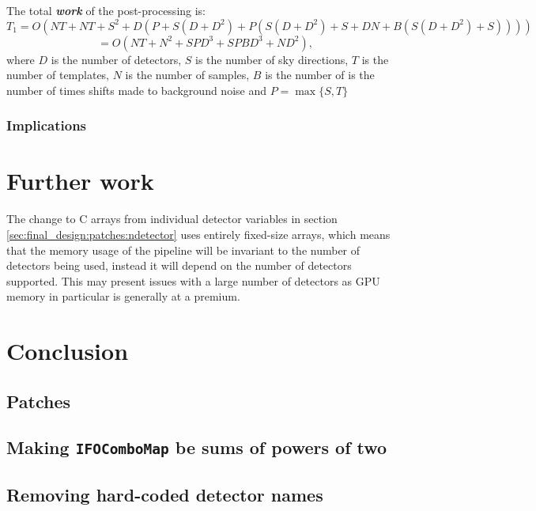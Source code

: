 \documentclass{article}
\begin{document}
The total \textit{\textbf{work}} of the post-processing is:
\[
    T_1 = O(NT + NT + S^2 + D(P + S(D + D^2) + P(S(D + D^2) + S + DN + B(S(D + D^2) + S))))
\]
\begin{equation} \label{eq:total_work}
    = O(NT + N^2 + SPD^3 + SPBD^3 + ND^2),
\end{equation}
where \(D\) is the number of detectors, \(S\) is the number of sky directions, \(T\) is the number of templates, \(N\) is the number of samples, \(B\) is the number of is the number of times shifts made to background noise and \(P = \max\{ S, T \}\)

\subsubsection{Implications} \label{sec:discuss:analysis:implications}


\section{Further work} \label{sec:further_work}

The change to C arrays from individual detector variables in section \ref{sec:final_design:patches:ndetector} uses entirely fixed-size arrays, which means that the memory usage of the pipeline will be invariant to the number of detectors being used, instead it will depend on the number of detectors supported.
This may present issues with a large number of detectors as GPU memory in particular is generally at a premium.

\section{Conclusion} \label{sec:conclusion}

\printbibliography[heading=bibintoc]{}

\begin{appendices}
    \section{Patches} \label{app:patches}
    \subsection{Making \texttt{IFOComboMap} be sums of powers of two} \label{app:patches:icombo}
    \linespread{0.3}
    \linespread{1}
    \subsection{Removing hard-coded detector names} \label{app:patches:ndetector}
    \linespread{0.3}
    \linespread{1}
\end{appendices}
\end{document}
